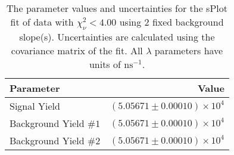 
\begin{table}
    \begin{center}
        \begin{tabular}{lr}\toprule
            Parameter & Value \\\midrule
            Signal Yield & $(5.05671 \pm 0.00010) \times 10^{4}$ \\
            Background Yield $\#1$ & $(5.05671 \pm 0.00010) \times 10^{4}$ \\
            Background Yield $\#2$ & $(5.05671 \pm 0.00010) \times 10^{4}$ \\\bottomrule
        \end{tabular}
        \caption{The parameter values and uncertainties for the sPlot fit of data with $\chi^2_\nu < 4.00$ using 2 fixed background slope(s). Uncertainties are calculated using the covariance matrix of the fit. All $\lambda$ parameters have units of $\si{\nano\second}^{-1}$.}
    \end{center}
\end{table}
